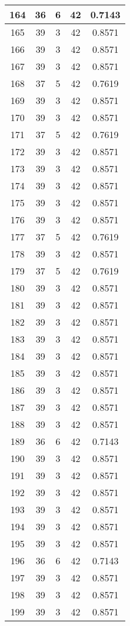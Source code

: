 \documentclass[letterpaper, 12pt]{article}
\begin{document}
\begin{longtable}{|c|c|c|c|c|}
\hline
164 & 36 & 6 & 42 & 0.7143 \\
\hline
165 & 39 & 3 & 42 & 0.8571 \\
\hline
166 & 39 & 3 & 42 & 0.8571 \\
\hline
167 & 39 & 3 & 42 & 0.8571 \\
\hline
168 & 37 & 5 & 42 & 0.7619 \\
\hline
169 & 39 & 3 & 42 & 0.8571 \\
\hline
170 & 39 & 3 & 42 & 0.8571 \\
\hline
171 & 37 & 5 & 42 & 0.7619 \\
\hline
172 & 39 & 3 & 42 & 0.8571 \\
\hline
173 & 39 & 3 & 42 & 0.8571 \\
\hline
174 & 39 & 3 & 42 & 0.8571 \\
\hline
175 & 39 & 3 & 42 & 0.8571 \\
\hline
176 & 39 & 3 & 42 & 0.8571 \\
\hline
177 & 37 & 5 & 42 & 0.7619 \\
\hline
178 & 39 & 3 & 42 & 0.8571 \\
\hline
179 & 37 & 5 & 42 & 0.7619 \\
\hline
180 & 39 & 3 & 42 & 0.8571 \\
\hline
181 & 39 & 3 & 42 & 0.8571 \\
\hline
182 & 39 & 3 & 42 & 0.8571 \\
\hline
183 & 39 & 3 & 42 & 0.8571 \\
\hline
184 & 39 & 3 & 42 & 0.8571 \\
\hline
185 & 39 & 3 & 42 & 0.8571 \\
\hline
186 & 39 & 3 & 42 & 0.8571 \\
\hline
187 & 39 & 3 & 42 & 0.8571 \\
\hline
188 & 39 & 3 & 42 & 0.8571 \\
\hline
189 & 36 & 6 & 42 & 0.7143 \\
\hline
190 & 39 & 3 & 42 & 0.8571 \\
\hline
191 & 39 & 3 & 42 & 0.8571 \\
\hline
192 & 39 & 3 & 42 & 0.8571 \\
\hline
193 & 39 & 3 & 42 & 0.8571 \\
\hline
194 & 39 & 3 & 42 & 0.8571 \\
\hline
195 & 39 & 3 & 42 & 0.8571 \\
\hline
196 & 36 & 6 & 42 & 0.7143 \\
\hline
197 & 39 & 3 & 42 & 0.8571 \\
\hline
198 & 39 & 3 & 42 & 0.8571 \\
\hline
199 & 39 & 3 & 42 & 0.8571 \\
\hline
\end{longtable}
\end{document}
